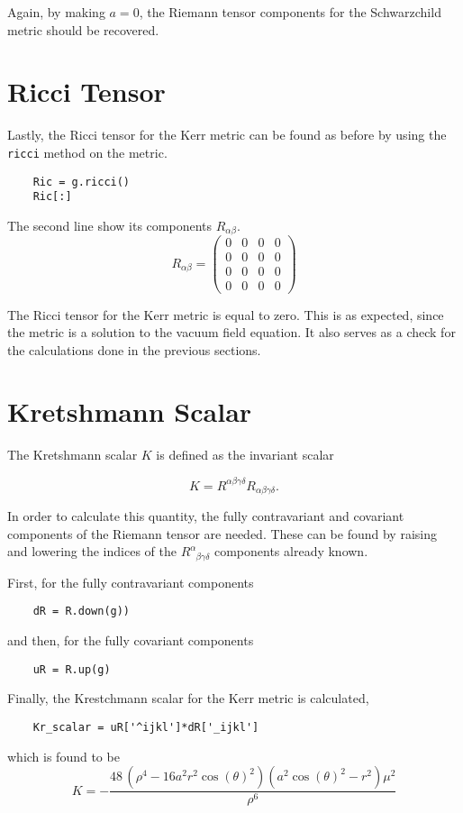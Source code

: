 \documentclass[11pt,a4paper]{article}
\begin{document}
Again, by making $a = 0$, the Riemann tensor components for the Schwarzchild metric should be recovered. 
\section{Ricci Tensor}
Lastly, the Ricci tensor for the Kerr metric can be found as before by using the \texttt{ricci} method on the metric. 
\begin{lstlisting}
	Ric = g.ricci()
	Ric[:]
\end{lstlisting}
The second line show its components $R_{\alpha\beta}$.
\begin{equation}
R_{\alpha\beta} = 
\left(\begin{array}{rrrr}
	0 & 0 & 0 & 0 \\
	0 & 0 & 0 & 0 \\
	0 & 0 & 0 & 0 \\
	0 & 0 & 0 & 0
\end{array}\right)
\end{equation}

The Ricci tensor for the Kerr metric is equal to zero. This is as expected, since the metric is a solution to the vacuum field equation. It also serves as a check for the calculations done in the previous sections.  

\section{Kretshmann Scalar}

The Kretshmann scalar $K$ is defined as the invariant scalar

\begin{equation}
	K = R^{\alpha\beta\gamma\delta}R_{\alpha\beta\gamma\delta}.
\end{equation}

In order to calculate this quantity, the fully contravariant and covariant components of the Riemann tensor are needed. These can be found by raising and lowering the indices of the $R^\alpha_{\phantom{\alpha}\beta\gamma\delta}$ components already known. 

First, for the fully contravariant components
\begin{lstlisting}
	dR = R.down(g))
\end{lstlisting}
and then, for the fully covariant components
\begin{lstlisting}
	uR = R.up(g)
\end{lstlisting}

Finally, the Krestchmann scalar for the Kerr metric is calculated,
\begin{lstlisting}
	Kr_scalar = uR['^ijkl']*dR['_ijkl']
\end{lstlisting}
which is found to be
\begin{equation}\label{kresh}
	K = -\frac{48 \, {\left(\rho^4 -16 a^2 r^2 \cos\left({\theta}\right)^2 \right)} {\left(a^2 \cos\left({\theta}\right)^2 - r^2\right)} {\mu}^{2}}{\rho^{6}}
\end{equation}
\end{document}
